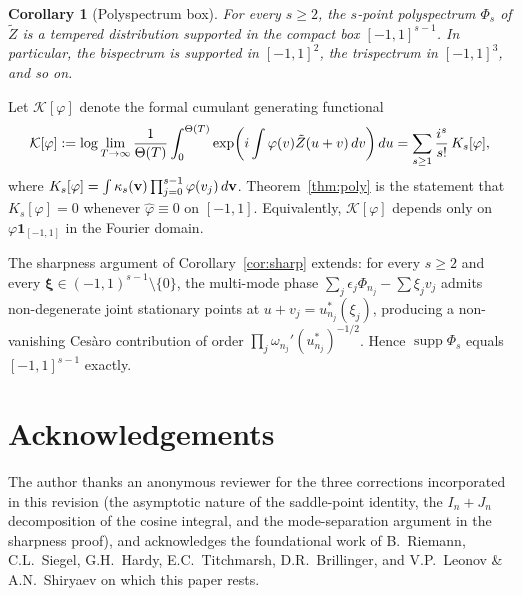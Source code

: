 \documentclass{amsart}
\newcommand{\assign}{:=}
\newcommand{\tmmathbf}[1]{\ensuremath{\boldsymbol{#1}}}
\newcommand{\tmop}[1]{\ensuremath{\operatorname{#1}}}
\newtheorem{corollary}{Corollary}
\newcommand{\supp}{\tmop{supp}}
\newcommand{\Zt}{\tilde{Z}}
\begin{document}
\begin{corollary}
  [Polyspectrum box]\label{cor:poly-box} For every $s \ge 2$, the $s$-point
  polyspectrum $\Phi_s$ of $\Zt$ is a tempered distribution supported in the
  compact box $[- 1, 1]^{s - 1}$. In particular, the bispectrum is supported
  in $[- 1, 1]^2$, the trispectrum in $[- 1, 1]^3$, and so on.
\end{corollary}

\begin{remark}
   Let $\mathcal{K} [\varphi]$ denote the
  formal cumulant generating functional
  \[ \mathcal{K} [\varphi] \assign \log \lim_{T \to \infty}  \frac{1}{\Theta
     (T)}  \int_0^{\Theta (T)} \exp \hspace{-0.17em} \left( i \int \varphi (v)
     \Zt (u + v) \hspace{0.17em} dv \right) du = \sum_{s \ge 1} \frac{i^s}{s!}
     \hspace{0.17em} K_s [\varphi], \]
  where $K_s [\varphi] = \int \kappa_s (\mathbf{v})  \prod_{j = 0}^{s - 1}
  \varphi (v_j)  \hspace{0.17em} d \mathbf{v}$. Theorem~\ref{thm:poly} is the
  statement that $K_s [\varphi] = 0$ whenever $\hat{\varphi} \equiv 0$ on $[-
  1, 1]$. Equivalently, $\mathcal{K} [\varphi]$ depends only on $\varphi
  \textbf{1}_{[- 1, 1]}$ in the Fourier domain.
\end{remark}

\begin{remark}
   The sharpness argument of
  Corollary~\ref{cor:sharp} extends: for every $s \ge 2$ and every
  $\tmmathbf{\xi} \in (- 1, 1)^{s - 1} \setminus \{0\}$, the multi-mode phase
  $\sum_j \epsilon_j \Phi_{n_j} - \sum \xi_j v_j$ admits non-degenerate joint
  stationary points at $u + v_j = u_{n_j}^{\ast} (\xi_j)$, producing a
  non-vanishing Ces{\`a}ro contribution of order $\prod_j \omega_{n_j}'
  (u_{n_j}^{\ast})^{- 1 / 2}$. Hence $\supp \Phi_s$ equals $[- 1, 1]^{s - 1}$
  exactly.
\end{remark}

\section*{Acknowledgements}

The author thanks an anonymous reviewer for the three corrections incorporated
in this revision (the asymptotic nature of the saddle-point identity, the $I_n
+ J_n$ decomposition of the cosine integral, and the mode-separation argument
in the sharpness proof), and acknowledges the foundational work of B.~Riemann,
C.{\hspace{0.17em}}L.~Siegel, G.{\hspace{0.17em}}H.~Hardy,
E.{\hspace{0.17em}}C.~Titchmarsh, D.{\hspace{0.17em}}R.~Brillinger, and
V.{\hspace{0.17em}}P.~Leonov \& A.{\hspace{0.17em}}N.~Shiryaev on which this
paper rests.
\end{document}

